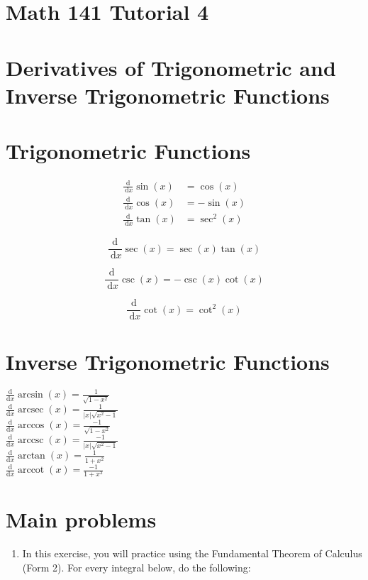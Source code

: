 \documentclass[10pt]{article}
\begin{document}
\section*{Math 141 Tutorial 4}
\section*{Derivatives of Trigonometric and Inverse Trigonometric Functions}
\section*{Trigonometric Functions}
$$
\begin{aligned}
\frac{\mathrm{d}}{\mathrm{~d} x} \sin (x) & =\cos (x) \\
\frac{\mathrm{d}}{\mathrm{~d} x} \cos (x) & =-\sin (x) \\
\frac{\mathrm{d}}{\mathrm{~d} x} \tan (x) & =\sec ^{2}(x)
\end{aligned}
$$

$$
\frac{\mathrm{d}}{\mathrm{~d} x} \sec (x)=\sec (x) \tan (x)
$$

$$
\frac{\mathrm{d}}{\mathrm{~d} x} \csc (x)=-\csc (x) \cot (x)
$$

$$
\frac{\mathrm{d}}{\mathrm{~d} x} \cot (x)=\cot ^{2}(x)
$$

\section*{Inverse Trigonometric Functions}
$\frac{\mathrm{d}}{\mathrm{d} x} \arcsin (x)=\frac{1}{\sqrt{1-x^{2}}}$\\
$\frac{\mathrm{d}}{\mathrm{d} x} \operatorname{arcsec}(x)=\frac{1}{|x| \sqrt{x^{2}-1}}$\\
$\frac{\mathrm{d}}{\mathrm{d} x} \arccos (x)=\frac{-1}{\sqrt{1-x^{2}}}$\\
$\frac{\mathrm{d}}{\mathrm{d} x} \operatorname{arccsc}(x)=\frac{-1}{|x| \sqrt{x^{2}-1}}$\\
$\frac{\mathrm{d}}{\mathrm{d} x} \arctan (x)=\frac{1}{1+x^{2}}$\\
$\frac{\mathrm{d}}{\mathrm{d} x} \operatorname{arccot}(x)=\frac{-1}{1+x^{2}}$

\section*{Main problems}
\begin{enumerate}
  \item In this exercise, you will practice using the Fundamental Theorem of Calculus (Form 2). For every integral below, do the following:
\end{enumerate}
\end{document}
